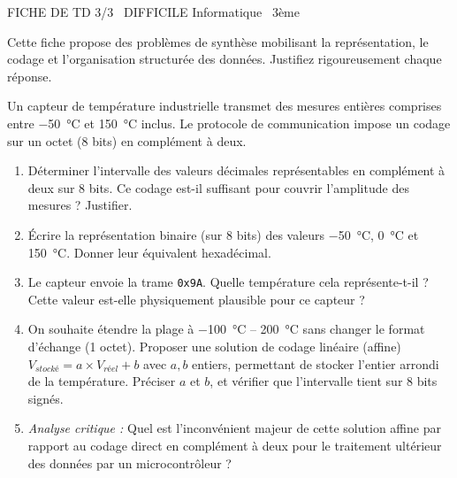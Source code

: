 \documentclass[11pt]{article}
\begin{document}
\begin{tcolorbox}[enhanced,colback=popink,colframe=popink,arc=10pt,boxrule=0pt,left=12pt,right=12pt,top=9pt,bottom=9pt]
{\color{white}\popxbold\small FICHE DE TD 3/3 \textbullet\ DIFFICILE \hfill Informatique \textbullet\ 3ème\par}
\end{tcolorbox}
\vspace{4pt}
Cette fiche propose des problèmes de synthèse mobilisant la représentation, le codage et l'organisation structurée des données. Justifiez rigoureusement chaque réponse.

\begin{exercice}
Un capteur de température industrielle transmet des mesures entières comprises entre \SI{-50}{\celsius} et \SI{+150}{\celsius} inclus. Le protocole de communication impose un codage sur un octet (8 bits) en complément à deux.
\begin{enumerate}
    \item Déterminer l'intervalle des valeurs décimales représentables en complément à deux sur 8 bits. Ce codage est-il suffisant pour couvrir l'amplitude des mesures ? Justifier.
    \item Écrire la représentation binaire (sur 8 bits) des valeurs \SI{-50}{\celsius}, \SI{0}{\celsius} et \SI{+150}{\celsius}. Donner leur équivalent hexadécimal.
    \item Le capteur envoie la trame \texttt{0x9A}. Quelle température cela représente-t-il ? Cette valeur est-elle physiquement plausible pour ce capteur ?
    \item On souhaite étendre la plage à \SI{-100}{\celsius} -- \SI{+200}{\celsius} sans changer le format d'échange (1 octet). Proposer une solution de codage linéaire (affine) $V_{stocké} = a \times V_{réel} + b$ avec $a, b$ entiers, permettant de stocker l'entier arrondi de la température. Préciser $a$ et $b$, et vérifier que l'intervalle tient sur 8 bits signés.
    \item \textit{Analyse critique :} Quel est l'inconvénient majeur de cette solution affine par rapport au codage direct en complément à deux pour le traitement ultérieur des données par un microcontrôleur ?
\end{enumerate}
\end{exercice}
\end{document}
